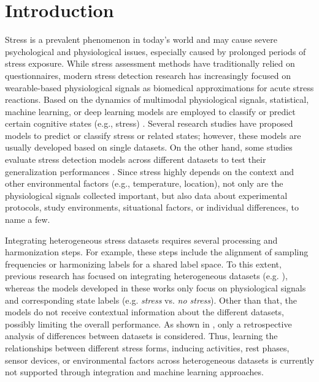 \documentclass[
]{ceurart}
\begin{document}
\section{Introduction} \label{sec:introduction}
Stress is a prevalent phenomenon in today's world and may cause severe psychological and physiological issues, especially caused by prolonged periods of stress exposure. While stress assessment methods have traditionally relied on questionnaires, modern stress detection research has increasingly focused on wearable-based physiological signals as biomedical approximations for acute stress reactions. Based on the dynamics of multimodal physiological signals, statistical, machine learning, or deep learning models are employed to classify or predict certain cognitive states (e.g., stress) \cite{hovsepian2015cstress}. Several research studies \cite{schmidt2018introducing, benita2024stress, wang2024husformer} have proposed models to predict or classify stress or related states; however, these models are usually developed based on single datasets. On the other hand, some studies evaluate stress detection models across different datasets to test their generalization performances \cite{prajod2024stressor, schreiber2026autostress}. Since stress highly depends on the context and other environmental factors (e.g., temperature, location), not only are the physiological signals collected important, but also data about experimental protocols, study environments, situational factors, or individual differences, to name a few.

Integrating heterogeneous stress datasets requires several processing and harmonization steps. For example, these steps include the alignment of sampling frequencies or harmonizing labels for a shared label space. To this extent, previous research has focused on integrating heterogeneous datasets (e.g. \cite{jui2026automated, prajod2024stressor, schreiber2026autostress}), whereas the models developed in these works only focus on physiological signals and corresponding state labels (e.g. \textit{stress} vs. \textit{no stress}). Other than that, the models do not receive contextual information about the different datasets, possibly limiting the overall performance. As shown in \cite{prajod2024stressor, schreiber2026autostress}, only a retrospective analysis of differences between datasets is considered. Thus, learning the relationships between different stress forms, inducing activities, rest phases, sensor devices, or environmental factors across heterogeneous datasets is currently not supported through integration and machine learning approaches.
\end{document}
